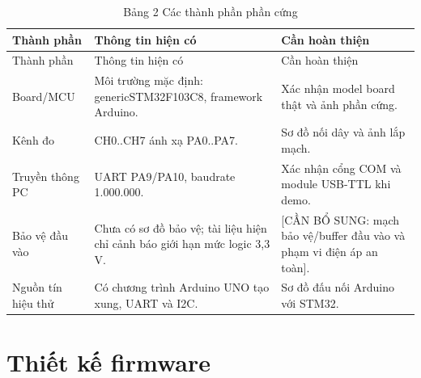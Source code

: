 \begin{longtable}[]{@{}
  >{\raggedright\arraybackslash}p{}
  >{\raggedright\arraybackslash}p{}
  >{\raggedright\arraybackslash}p{}@{}}
\caption{Bảng 2 Các thành phần phần cứng}\tabularnewline
\toprule\noalign{}
\begin{minipage}[b]{\linewidth}\raggedright
Thành phần
\end{minipage} & \begin{minipage}[b]{\linewidth}\raggedright
Thông tin hiện có
\end{minipage} & \begin{minipage}[b]{\linewidth}\raggedright
Cần hoàn thiện
\end{minipage} \\
\midrule\noalign{}
\endfirsthead
\toprule\noalign{}
\begin{minipage}[b]{\linewidth}\raggedright
Thành phần
\end{minipage} & \begin{minipage}[b]{\linewidth}\raggedright
Thông tin hiện có
\end{minipage} & \begin{minipage}[b]{\linewidth}\raggedright
Cần hoàn thiện
\end{minipage} \\
\midrule\noalign{}
\endhead
\bottomrule\noalign{}
\endlastfoot
Board/MCU & Môi trường mặc định: genericSTM32F103C8, framework Arduino. & Xác nhận model board thật và ảnh phần cứng. \\
Kênh đo & CH0..CH7 ánh xạ PA0..PA7. & Sơ đồ nối dây và ảnh lắp mạch. \\
Truyền thông PC & UART PA9/PA10, baudrate 1.000.000. & Xác nhận cổng COM và module USB-TTL khi demo. \\
Bảo vệ đầu vào & Chưa có sơ đồ bảo vệ; tài liệu hiện chỉ cảnh báo giới hạn mức logic 3,3 V. & {[}CẦN BỔ SUNG: mạch bảo vệ/buffer đầu vào và phạm vi điện áp an toàn{]}. \\
Nguồn tín hiệu thử & Có chương trình Arduino UNO tạo xung, UART và I2C. & Sơ đồ đấu nối Arduino với STM32. \\
\end{longtable}

\section{Thiết kế firmware}\label{thiux1ebft-kux1ebf-firmware}

